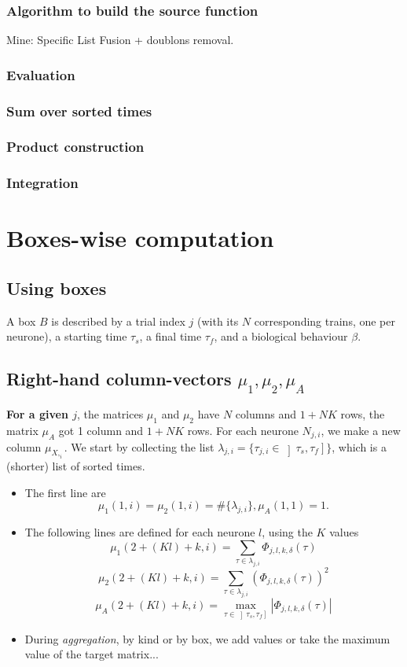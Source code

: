 \documentclass{revtex4}
\begin{document}
\subsubsection{Algorithm to build the source function}
Mine: Specific List Fusion + doublons removal.

\subsubsection{Evaluation}

\subsubsection{Sum over sorted times}

\subsubsection{Product construction}

\subsubsection{Integration}


\section{Boxes-wise computation}
\subsection{Using boxes}
A box $B$ is described by a trial index $j$ (with its $N$ corresponding trains, one per neurone),
a starting time $\tau_{s}$, a final time $\tau_{f}$, and a biological behaviour $\beta$.

\subsection{Right-hand column-vectors $\mu_1,\mu_2,\mu_A$}
{\bf For a given $j$}, the matrices $\mu_1$ and $\mu_2$ have $N$ columns and $1+NK$ rows,
the matrix $\mu_A$ got 1 column and $1+NK$ rows.
For each neurone $N_{j,i}$, we make a new column $\mu_{X,_i}$.
We start by collecting the list $\lambda_{j,i}=\lbrace\tau_{j,i}\in\left\rbrack\tau_s,\tau_f\right\rbrack\rbrace$,
which is a (shorter) list of sorted times.
\begin{itemize}
\item
The first line are
$$
	\mu_1(1,i) = \mu_2(1,i) = \#\lbrace\lambda_{j,i}\rbrace, \mu_A(1,1) =1.
$$
\item
The following lines are defined for each neurone $l$, using the $K$ values
$$
	\mu_1(2+(Kl)+k,i) = \sum_{\tau\in\lambda_{j,i}} \Phi_{j,l,k,\delta}(\tau)
$$
$$
	\mu_2(2+(Kl)+k,i) = \sum_{\tau\in\lambda_{j,i}} \left(\Phi_{j,l,k,\delta}(\tau)\right)^2
$$
$$
	\mu_A(2+(Kl)+k,i) = \max_{\tau\in\left\rbrack\tau_s,\tau_f\right\rbrack} \left| \Phi_{j,l,k,\delta}(\tau) \right|
$$
\item During \emph{aggregation}, by kind or by box, we add values or take the maximum value of the target matrix...
\end{itemize}
\end{document}
